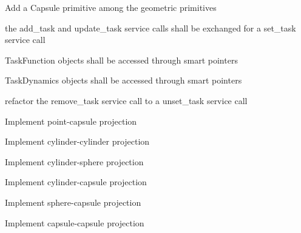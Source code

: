 
\begin{DoxyRefList}
\item[\label{todo__todo000001}%
\hypertarget{todo__todo000001}{}%
Member \hyperlink{classhiqp_1_1geometric__primitives_1_1GeometricPrimitiveMap_a6ddc5d3b4e8e44748fbb0c9e66957952}{hiqp\-:\-:geometric\-\_\-primitives\-:\-:Geometric\-Primitive\-Map\-:\-:add\-Geometric\-Primitive} (const std\-::string \&name, const std\-::string \&type, const std\-::string \&frame\-\_\-id, bool visible, const std\-::vector$<$ double $>$ \&color, const std\-::vector$<$ double $>$ \&parameters)]Add a Capsule primitive among the geometric primitives  
\item[\label{todo__todo000002}%
\hypertarget{todo__todo000002}{}%
Member \hyperlink{classhiqp_1_1TaskManager_a6ae5db3755ca5231a99b1b0c5f06e00d}{hiqp\-:\-:Task\-Manager\-:\-:add\-Task} (const std\-::string \&name, const std\-::string \&type, const std\-::vector$<$ std\-::string $>$ \&behaviour\-\_\-parameters, unsigned int priority, bool visibility, const std\-::vector$<$ std\-::string $>$ \&parameters, const Hi\-Q\-P\-Time\-Point \&sampling\-\_\-time, const K\-D\-L\-::\-Tree \&kdl\-\_\-tree, const K\-D\-L\-::\-Jnt\-Array\-Vel \&kdl\-\_\-joint\-\_\-pos\-\_\-vel)]the add\-\_\-task and update\-\_\-task service calls shall be exchanged for a set\-\_\-task service call 

Task\-Function objects shall be accessed through smart pointers 

Task\-Dynamics objects shall be accessed through smart pointers  
\item[\label{todo__todo000003}%
\hypertarget{todo__todo000003}{}%
Member \hyperlink{classhiqp_1_1TaskManager_a1f58d497fa59e23506e6d7d60fe3693d}{hiqp\-:\-:Task\-Manager\-:\-:remove\-Task} (std\-::string task\-\_\-name)]refactor the remove\-\_\-task service call to a unset\-\_\-task service call  
\item[\label{todo__todo000004}%
\hypertarget{todo__todo000004}{}%
Member \hyperlink{classhiqp_1_1tasks_1_1TaskGeometricProjection_a37272247434d8b14c819649f25234cc6}{hiqp\-:\-:tasks\-:\-:Task\-Geometric\-Projection$<$ Primitive\-A, Primitive\-B $>$\-:\-:project} (Geometric\-Point $\ast$point1, Geometric\-Point $\ast$point2)]Implement point-\/capsule projection 

Implement cylinder-\/cylinder projection 

Implement cylinder-\/sphere projection 

Implement cylinder-\/capsule projection 

Implement sphere-\/capsule projection 

Implement capsule-\/capsule projection 
\end{DoxyRefList}